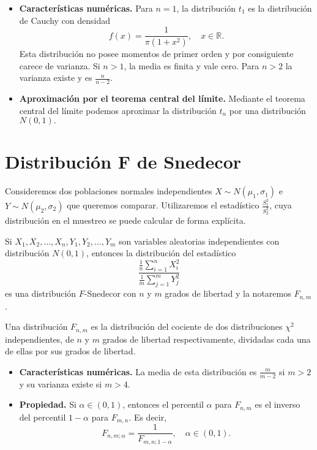 \begin{itemize}
    \item \textbf{Características numéricas.}
          Para $n = 1$, la distribución $t_1$ es la distribución de Cauchy con densidad
          $$f(x) = \frac{1}{\pi(1 + x^2)}, \quad x \in \mathbb{R}.$$
          Esta distribución no posee momentos de primer orden y por consiguiente carece de varianza.
          Si $n > 1$, la media es finita y vale cero.
          Para $n > 2$ la varianza existe y es $\frac{n}{n-2}$.

    \item \textbf{Aproximación por el teorema central del límite.}
          Mediante el teorema central del límite podemos aproximar la distribución $t_n$ por una distribución $N(0, 1).$
\end{itemize}

\section{Distribución F de Snedecor}
Consideremos dos poblaciones normales independientes $X \sim N(\mu_1, \sigma_1)$ e $Y \sim N(\mu_2, \sigma_2)$ que queremos comparar.
Utilizaremos el estadístico $\frac{S_1^2}{S_2^2}$, cuya distribución en el muestreo se puede calcular de forma explícita.

\begin{definition}
    Si $X_1, X_2, \dots, X_n, Y_1, Y_2, \dots, Y_m$ son variables aleatorias independientes con distribución $N(0,1)$, entonces la distribución del estadístico
    $$\frac{\frac{1}{n}\sum_{i=1}^n{X_i^2}}{\frac{1}{m}\sum_{j=1}^m{Y_j^2}}$$
    es una distribución $F$-Snedecor con $n$ y $m$ grados de libertad y la notaremos $F_{n, m}$.
\end{definition}

Una distribución $F_{n,m}$ es la distribución del cociente de dos distribuciones $\chi^2$ independientes, de $n$ y $m$ grados de libertad respectivamente, dividadas cada una de ellas por sus grados de libertad.

\begin{itemize}
    \item \textbf{Características numéricas.}
          La media de esta distribución es $\frac{m}{m-2}$ si $m > 2$ y su varianza existe si $m > 4$.

    \item \textbf{Propiedad.}
          Si $\alpha \in (0, 1)$, entonces el percentil $\alpha$ para $F_{n, m}$ es el inverso del percentil $1-\alpha$ para $F_{m, n}$.
          Es decir,
          $$F_{n, m; \alpha} = \frac{1}{F_{m, n; 1-\alpha}}, \quad \alpha \in (0, 1).$$
\end{itemize}

